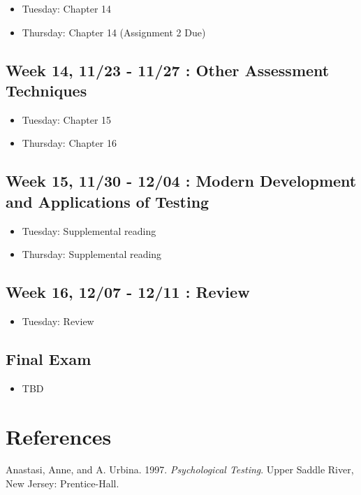 \documentclass[11pt,]{article}
\providecommand{\tightlist}{%
  \setlength{\itemsep}{0pt}\setlength{\parskip}{0pt}}
\begin{document}
\begin{itemize}
\tightlist
\item
  Tuesday: Chapter 14
\item
  Thursday: Chapter 14 (Assignment 2 Due)
\end{itemize}

\hypertarget{week-14-1123---1127-other-assessment-techniques}{%
\subsection{Week 14, 11/23 - 11/27 : Other Assessment
Techniques}\label{week-14-1123---1127-other-assessment-techniques}}

\begin{itemize}
\tightlist
\item
  Tuesday: Chapter 15
\item
  Thursday: Chapter 16
\end{itemize}

\hypertarget{week-15-1130---1204-modern-development-and-applications-of-testing}{%
\subsection{Week 15, 11/30 - 12/04 : Modern Development and Applications
of
Testing}\label{week-15-1130---1204-modern-development-and-applications-of-testing}}

\begin{itemize}
\tightlist
\item
  Tuesday: Supplemental reading
\item
  Thursday: Supplemental reading
\end{itemize}

\hypertarget{week-16-1207---1211-review}{%
\subsection{Week 16, 12/07 - 12/11 :
Review}\label{week-16-1207---1211-review}}

\begin{itemize}
\tightlist
\item
  Tuesday: Review
\end{itemize}

\hypertarget{final-exam}{%
\subsection{Final Exam}\label{final-exam}}

\begin{itemize}
\tightlist
\item
  TBD
\end{itemize}

\hypertarget{references}{%
\section*{References}\label{references}}

\hypertarget{refs}{}
\leavevmode\hypertarget{ref-anastasi1997}{}%
Anastasi, Anne, and A. Urbina. 1997. \emph{Psychological Testing}. Upper
Saddle River, New Jersey: Prentice-Hall.
\end{document}
